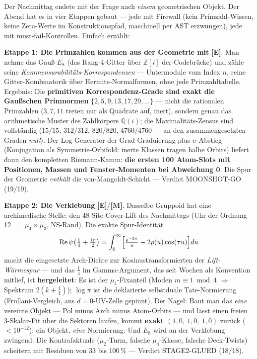\documentclass[11pt,a4paper]{article}
\newcommand{\E}{\textcolor{gut}{\textbf{[E]}}}
\newcommand{\M}{\textcolor{mess}{\textbf{[M]}}}
\begin{document}
Der Nachmittag endete mit der Frage nach \emph{einem} geometrischen
Objekt. Der Abend hat es in vier Etappen gebaut --- jede mit
Firewall (kein Primzahl-Wissen, keine Zeta-Werte im
Konstruktionspfad, maschinell per AST erzwungen), jede mit
must-fail-Kontrollen. Einfach erzählt:

\textbf{Etappe 1: Die Primzahlen kommen aus der Geometrie mit} \E{}.
Man nehme das Gauß-$E_8$ (das Rang-4-Gitter über $\mathbb{Z}[i]$ der
Codebrücke) und zähle seine \emph{Kommensurabilitäts-Korrespondenzen}
--- Untermodule vom Index $n$, reine Gitter-Kombinatorik über
Hermite-Normalformen, ohne jede Primzahltabelle. Ergebnis: Die
\textbf{primitiven Korrespondenz-Grade sind exakt die Gaußschen
Primnormen} $\{2, 5, 9, 13, 17, 29, \dots\}$ --- nicht die
rationalen Primzahlen ($3, 7, 11$ treten nur als Quadrate auf,
inert), sondern genau das arithmetische Muster des Zahlkörpers
$\mathbb{Q}(i)$; die Maximalitäts-Zensus sind vollständig
($15/15$, $312/312$, $820/820$, $4760/4760$ --- an den
zusammengesetzten Graden \emph{null}). Der Log-Generator der
Grad-Graduierung plus $\sigma$-Abstieg (Konjugation als
Symmetrie-Orbifold: inerte Klassen tragen halbe Orbits) liefert dann
den kompletten Riemann-Kamm: \textbf{die ersten 100 Atom-Slots mit
Positionen, Massen und Fenster-Momenten bei Abweichung 0}. Die
Spur der Geometrie \emph{enthält} die von-Mangoldt-Schicht ---
Verdict MOONSHOT-GO (19/19).

\textbf{Etappe 2: Die Verklebung} \E{}/\M{}. Dasselbe Gruppoid hat
eine archimedische Stelle: den 48-Site-Cover-Lift des Nachmittags
(Uhr der Ordnung 12 $=$ $\mu_4 \times \mu_3$, NS-Rand). Die exakte
Spur-Identität
\[
\operatorname{Re}\psi\!\left(\tfrac14 + \tfrac{i\tau}{2}\right)
= \int_0^\infty \Bigl[\tfrac{e^{-2u}}{u} - 2\rho(u)\cos(\tau u)\Bigr]du
\]
macht die eingesetzte Arch-Dichte zur Kosinustransformierten der
\emph{Lift-Wärmespur} --- und das $\tfrac14$ im Gamma-Argument, das
seit Wochen als Konvention mitlief, ist \textbf{hergeleitet}: Es ist
der $\mu_4$-Fixanteil (Moden $m \equiv 1 \bmod 4$ $\Rightarrow$
Spektrum $2(k + \tfrac14)$); $\log\pi$ ist die deklarierte
selbstduale Tate-Normierung (Frullani-Vergleich, ans
$d = 0$-UV-Zelle gepinnt). Der Nagel: Baut man das \emph{eine}
vereinte Objekt --- Pol minus Arch minus Atom-Orbits --- und lässt
einen freien 3-Skalar-Fit über die Sektoren laufen, kommt
\textbf{exakt $(1{,}0,\ 1{,}0,\ 1{,}0)$} zurück ($< 10^{-12}$): ein
Objekt, \emph{eine} Normierung. Und $E_8$ wird an der Verklebung
zwingend: Die Kontrafaktuale ($\mu_2$-Turm, falsche $\mu_4$-Klasse,
falsche Deck-Twists) scheitern mit Residuen von 33 bis 100\,\%
--- Verdict STAGE2-GLUED (18/18).
\end{document}
